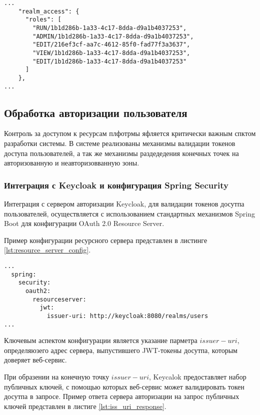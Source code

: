 \begin{lstlisting}[caption={Пример представления ролей пользователе в токене досутпа}, label=lst:roles_in_token]
...
    "realm_access": {
      "roles": [
        "RUN/1b1d286b-1a33-4c17-8dda-d9a1b4037253",
        "ADMIN/1b1d286b-1a33-4c17-8dda-d9a1b4037253",
        "EDIT/216ef3cf-aa7c-4612-85f0-fad77f3a3637",
        "VIEW/1b1d286b-1a33-4c17-8dda-d9a1b4037253",
        "EDIT/1b1d286b-1a33-4c17-8dda-d9a1b4037253"
      ]
    },
...
\end{lstlisting}

\subsection{Обработка авторизации пользователя}

Контроль за доступом к ресурсам плфотрмы яфляется критически важным спктом разработки системы. В системе реализованы механизмы валидации токенов доступа пользователей, а так же механизмы раздедедения конечных точек на авторизованную и неавторизовванную зоны.

\subsubsection{Интеграция с Keycloak и конфигурация Spring Security}

Интеграция с сервером авторизации Keycloak, для валидации токенов досутпа пользователей, осуществляется с использованием стандартных механизмов Spring Boot для конфигурации OAuth 2.0 Resource Server\cite{ferry2015security}.

Пример конфигурации ресурсного сервера представлен в листинге \ref{lst:resource_server_config}.

\begin{lstlisting}[caption={Конфигурация Resource Server}, label=lst:resource_server_config]
...
  spring:
    security:
      oauth2:
        resourceserver:
          jwt:
            issuer-uri: http://keycloak:8080/realms/users
...
\end{lstlisting}

Ключевым аспектом конфигурации является указание парметра $issuer-uri$, определяюзего адрес сервера, выпустившего JWT-токены досутпа, которым доверяет веб-сервис.

При образении на конечную точку $issuer-uri$, Keycalok предоставляет набор публичных ключей, с помощью которых веб-сервис может валидировать токен досутпа в запросе. Пример ответа сервера авторизации на запрос публичных ключей представлен в листиге \ref{lst:iss_uri_response}.


